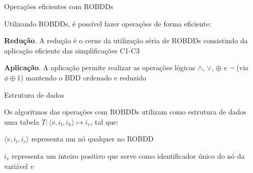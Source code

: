 \expandafter\documentclass\expandafter[table, usenames, svgnames, dvipsnames,14pt, \classopts]{beamer}
\begin{document}
\begin{frame}{Operações eficientes com ROBDDs}

    Utilizando ROBDDs, é possível fazer operações de forma eficiente:
    
    \begin{outline}
        \1 \textbf{Redução}. A redução é o cerne da utilização séria de ROBDDs
            \2[-] consistindo da aplicação eficiente das simplificações C1-C3
            
        \1 \textbf{Aplicação}. A aplicação permite realizar as operações lógicas $\land$, $\lor$, $\oplus$ e $\lnot$ (via $\phi \oplus 1$)
            \2[-] mantendo o BDD ordenado e reduzido
    \end{outline}

\end{frame}

\begin{frame}{Estrutura de dados}

    Os algoritmos das operações com ROBDDs utilizam como estrutura de dados uma tabela $T: \langle v,i_l,i_h \rangle \mapsto i_v$, tal que:

    \small
    \begin{outline}
        \1 $\langle v,i_l,i_r \rangle$ representa um nó qualquer no ROBDD
            
        \vspace{1em}
            
        \1 $i_v$ representa um inteiro positivo que serve como identificador único do nó da variável $v$
    \end{outline}

\end{frame}
\end{document}

